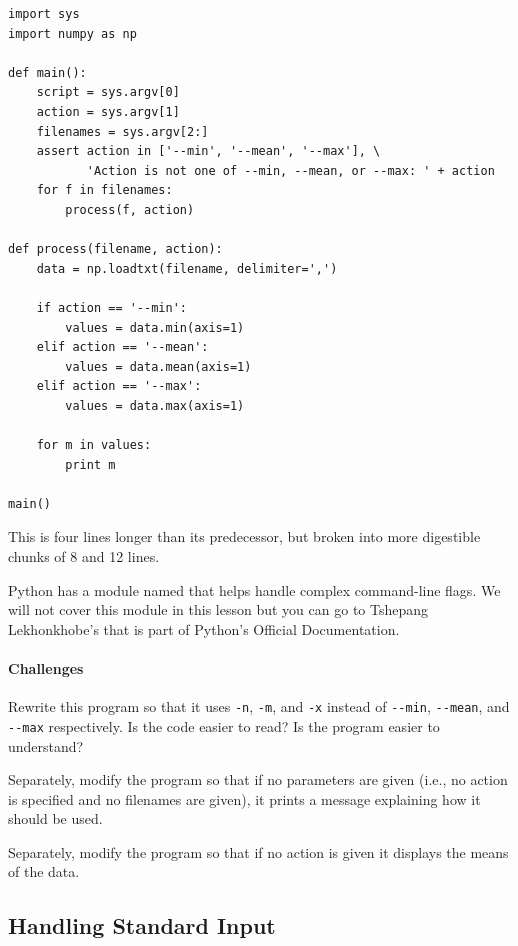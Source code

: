 \documentclass{book}
\begin{document}
\begin{verbatim}
import sys
import numpy as np

def main():
    script = sys.argv[0]
    action = sys.argv[1]
    filenames = sys.argv[2:]
    assert action in ['--min', '--mean', '--max'], \
           'Action is not one of --min, --mean, or --max: ' + action
    for f in filenames:
        process(f, action)

def process(filename, action):
    data = np.loadtxt(filename, delimiter=',')

    if action == '--min':
        values = data.min(axis=1)
    elif action == '--mean':
        values = data.mean(axis=1)
    elif action == '--max':
        values = data.max(axis=1)

    for m in values:
        print m

main()
\end{verbatim}

This is four lines longer than its predecessor, but broken into more
digestible chunks of 8 and 12 lines.

Python has a module named
 that
helps handle complex command-line flags. We will not cover this module
in this lesson but you can go to Tshepang Lekhonkhobe's
that is part of Python's Official Documentation.

\mbox{}\paragraph{Challenges}

\begin{swcenumerate}
\item
  Rewrite this program so that it uses \texttt{-n}, \texttt{-m}, and
  \texttt{-x} instead of \texttt{-{}-min}, \texttt{-{}-mean}, and
  \texttt{-{}-max} respectively. Is the code easier to read? Is the
  program easier to understand?
\item
  Separately, modify the program so that if no parameters are given
  (i.e., no action is specified and no filenames are given), it prints a
  message explaining how it should be used.
\item
  Separately, modify the program so that if no action is given it
  displays the means of the data.
\end{swcenumerate}

\subsection{Handling Standard Input}
\end{document}
